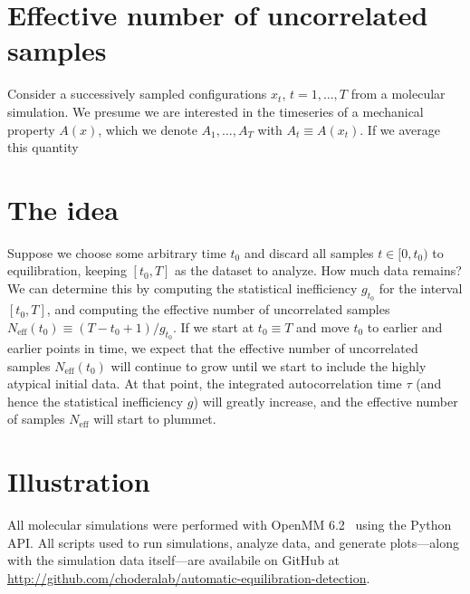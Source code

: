 \documentclass[aps,pre,twocolumn,nofootinbib,superscriptaddress,linenumbers,11point]{revtex4-1}
\begin{document}
\section*{Effective number of uncorrelated samples}
\label{section:statistical-inefficiency}

Consider a successively sampled configurations $x_t$, $t = 1, \ldots, T$ from a molecular simulation.
We presume we are interested in the timeseries of a mechanical property $A(x)$, which we denote $A_1, \ldots, A_T$ with $A_t \equiv A(x_t)$.
If we average this quantity 


\section*{The idea}
\label{section:the-idea}

Suppose we choose some arbitrary time $t_0$ and discard all samples $t \in [0, t_0)$ to equilibration, keeping $[t_0, T]$ as the dataset to analyze.
How much data remains?
We can determine this by computing the statistical inefficiency $g_{t_0}$ for the interval $[t_0, T]$, and computing the effective number of uncorrelated samples $N_\mathrm{eff}(t_0) \equiv (T - t_0 + 1) / g_{t_0}$.
If we start at $t_0 \equiv T$ and move $t_0$ to earlier and earlier points in time, we expect that the effective number of uncorrelated samples $N_\mathrm{eff}(t_0)$ will continue to grow until we start to include the highly atypical initial data.
At that point, the integrated autocorrelation time $\tau$ (and hence the statistical inefficiency $g$) will greatly increase, and the effective number of samples $N_\mathrm{eff}$ will start to plummet.



\section*{Illustration}
\label{section:methods}

All molecular simulations were performed with OpenMM 6.2~\cite{eastman:jctc:2012:openmm} using the Python API.
All scripts used to run simulations, analyze data, and generate plots---along with the simulation data itself---are availabile on GitHub at \url{http://github.com/choderalab/automatic-equilibration-detection}.
\end{document}
